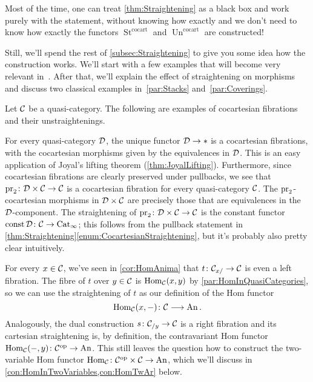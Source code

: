 Most of the time, one can treat \cref{thm:Straightening} as a black box and work purely with the statement, without knowing how exactly and we don't need to know how exactly the functors $\operatorname{St}^{\mathrm{cocart}}$ and $\operatorname{Un}^{\mathrm{cocart}}$ are constructed! 

Still, we'll spend the rest of \cref{subsec:Straightening} to give you some idea how the construction works. We'll start with a few examples that will become very relevant in~. After that, we'll explain the effect of straightening on morphisms and discuss two classical examples in~\cref{par:Stacks} and~\cref{par:Coverings}.

\begin{exm}\label{exm:Straightening}
	Let $\mathcal{C}$ be a quasi-category. The following are examples of cocartesian fibrations and their unstraightenings.
	\begin{alphanumerate}
		\item For every quasi-category $\mathcal{D}$, the unique functor $\mathcal{D}\rightarrow *$ is a cocartesian fibrations, with the cocartesian morphisms given by the equivalences in $\mathcal{D}$. This is an easy application of Joyal's lifting theorem (\cref{thm:JoyalLifting}). Furthermore, since cocartesian fibrations are clearly preserved under pullbacks, we see that $\operatorname{pr}_2\colon \mathcal{D}\times \mathcal{C}\rightarrow\mathcal{C}$ is a cocartesian fibration for every quasi-category $\mathcal{C}$. The $\operatorname{pr}_2$-cocartesian morphisms in $\mathcal{D}\times\mathcal{C}$ are precisely those that are equivalences in the $\mathcal{D}$-component. The straightening of $\operatorname{pr}_2\colon \mathcal{D}\times \mathcal{C}\rightarrow\mathcal{C}$ is the constant functor $\operatorname{const} \mathcal{D}\colon \mathcal{C}\rightarrow \mathrm{Cat}_\infty$; this follows from the pullback statement in \cref{thm:Straightening}\cref{enum:CocartesianStraightening}, but it's probably also pretty clear intuitively.\label{enum:ProjectionsStraightenToConstantFunctors}
		\item For every $x\in \mathcal{C}$, we've seen in \cref{cor:HomAnima} that $t\colon \mathcal{C}_{x/}\rightarrow \mathcal{C}$ is even a left fibration. The fibre of $t$ over $y\in\mathcal{C}$ is $\operatorname{Hom}_{\mathcal{C}}(x,y)$ by \cref{par:HomInQuasiCategories}, so we can use the straightening of $t$ as our definition of the Hom functor 
		\begin{equation*}
			\operatorname{Hom}_{\mathcal{C}}(x,-)\colon \mathcal{C}\longrightarrow \mathrm{An}\,.
		\end{equation*}
		Analogously, the dual construction $s\colon \mathcal{C}_{/y}\rightarrow \mathcal{C}$ is a right fibration and its cartesian straightening is, by definition, the contravariant Hom functor $\operatorname{Hom}_{\mathcal{C}}(-,y)\colon \mathcal{C}^{\mathrm{op}}\rightarrow \mathrm{An}$. This still leaves the question how to construct the two-variable Hom functor $\operatorname{Hom}_{\mathcal{C}}\colon \mathcal{C}^{\mathrm{op}}\times\mathcal{C}\rightarrow\mathrm{An}$, which we'll discuss in \cref{con:HomInTwoVariables,con:HomTwAr} below.\label{enum:SliceLeftFibration}

\end{alphanumerate}
\end{exm}

